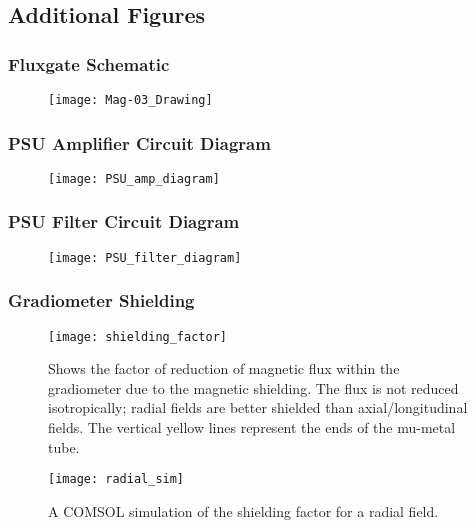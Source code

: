 \documentclass{TheMartianReport}
\begin{document}
\subsection{Additional Figures}
\subsubsection{Fluxgate Schematic}
\begin{figure}[h]
	\centering
	\texttt{[image: Mag-03\_Drawing]}
	\caption{}
	\label{fig:FGschematic}
\end{figure}

\pagebreak

\subsubsection{PSU Amplifier Circuit Diagram}
\begin{figure}[h]
	\centering
	\texttt{[image: PSU\_amp\_diagram]}
	\caption{}
	\label{fig:PSUamp}
\end{figure}

\subsubsection{PSU Filter Circuit Diagram}
\begin{figure}[h]
	\centering
	\texttt{[image: PSU\_filter\_diagram]}
	\caption{}
	\label{fig:PSUfilter}
\end{figure}

\pagebreak

\subsubsection{Gradiometer Shielding}
\begin{figure}[h]
	\centering
	\texttt{[image: shielding\_factor]}
	\caption{Shows the factor of reduction of magnetic flux within the gradiometer due to the magnetic shielding. The flux is not reduced isotropically; radial fields are better shielded than axial/longitudinal fields. The vertical yellow lines represent the ends of the mu-metal tube.}
	\label{fig:ShieldingFact}
\end{figure}

\begin{figure}[h]
	\centering
	\texttt{[image: radial\_sim]}
	\caption{A COMSOL simulation of the shielding factor for a radial field.}
	\label{fig:RadialSim}
\end{figure}
\end{document}

